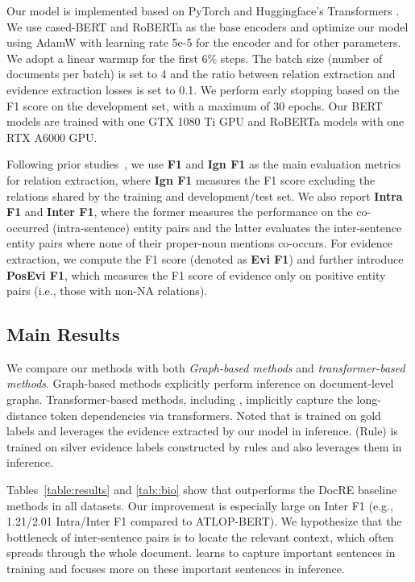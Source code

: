 \smallskip
{}
Our model is implemented based on PyTorch and Huggingface's Transformers \cite{wolf2019huggingface}. We use cased-BERT \cite{BERT} and RoBERTa as the base encoders and optimize our model using AdamW with learning rate 5e-5 for the encoder and  for other parameters. We adopt a linear warmup for the first 6\% steps. The batch size (number of documents per batch) is set to 4 and the ratio between relation extraction and evidence extraction losses is set to 0.1. We perform early stopping based on the F1 score on the development set, with a maximum of 30 epochs. Our BERT models are trained with one GTX 1080 Ti GPU and RoBERTa models with one RTX A6000 GPU.

\smallskip
{}
Following prior studies~\cite{DocRED-paper}, we use \textbf{F1} and \textbf{Ign F1} as the main evaluation metrics for relation extraction, where \textbf{Ign F1} measures the F1 score excluding the relations shared by the training and development/test set.
We also report \textbf{Intra F1} and \textbf{Inter F1}, where the former measures the performance on the co-occurred (intra-sentence) entity pairs and the latter evaluates the inter-sentence entity pairs where none of their proper-noun mentions co-occurs.
For evidence extraction, we compute the F1 score (denoted as \textbf{Evi F1}) and further introduce \textbf{PosEvi F1}, which measures the F1 score of evidence only on positive entity pairs (i.e., those with non-NA relations).

\subsection{Main Results}
We compare our methods with both \emph{Graph-based methods} and \emph{transformer-based methods}. Graph-based methods explicitly perform inference on document-level graphs. Transformer-based methods, including \ours, implicitly capture the long-distance token dependencies via transformers.
Noted that \ours is trained on gold labels and leverages the evidence extracted by our model in inference. \ours (Rule) is trained on silver evidence labels constructed by rules and also leverages them in inference. 

\smallskip
{}
Tables~\ref{table:results} and \ref{tab::bio} show that \ours outperforms the DocRE baseline methods in all datasets.
Our improvement is especially large on Inter F1 (e.g., 1.21/2.01 Intra/Inter F1 compared to ATLOP-BERT).
We hypothesize that the bottleneck of inter-sentence pairs is to locate the relevant context, which often spreads through the whole document. \ours learns to capture important sentences in training and focuses more on these important sentences in inference.

